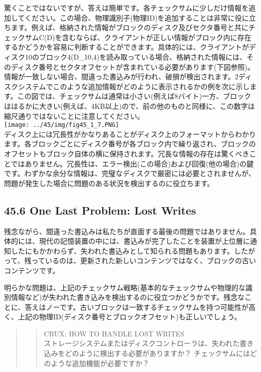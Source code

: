 驚くことではないですが、答えは簡単です。各チェックサムに少しだけ情報を追加してください。この場合、物理識別子(物理ID)を追加することは非常に役に立ちます。例えば、格納された情報がブロックのディスク及びセクタ番号と共にチェックサムC(D)を含むならば、クライアントが正しい情報がブロック内に存在するかどうかを容易に判断することができます。具体的には、クライアントがディスク10のブロック4(D\_10,4)を読み取っている場合、格納された情報には、そのディスク番号とセクタオフセットが含まれている必要があります(下図参照)。情報が一致しない場合、間違った書込みが行われ、破損が検出されます。2ディスクシステムでこのような追加情報がどのように表示されるかの例を次に示します。この図では、チェックサムは通常は小さい(例えば8バイト)一方、ブロックははるかに大きい(例えば、4KB以上)ので、前の他のものと同様に、この数字は縮尺通りではないことに注意してください。\\
\texttt{[image: ../45/img/fig45\_1\_7.PNG]}\\
ディスク上には冗長性がかなりあることがディスク上のフォーマットからわかります。各ブロックごとにディスク番号が各ブロック内で繰り返され、ブロックのオフセットもブロック自体の横に保持されます。冗長な情報の存在は驚くべきことではありません。冗長性は、エラー検出(この場合)および回復(他の場合)の鍵です。わずかな余分な情報は、完璧なディスクで厳密には必要とされませんが、問題が発生した場合に問題のある状況を検出するのに役立ちます。

\hypertarget{one-last-problem-lost-writes}{%
\subsection*{45.6 One Last Problem: Lost
Writes}\label{one-last-problem-lost-writes}}

残念ながら、間違った書込みは私たちが直面する最後の問題ではありません。具体的には、現代の記憶装置の中には、書込みが完了したことを装置が上位層に通知したにもかかわらず、失われた書込みとして知られる問題もあります。したがって、残っているのは、更新された新しいコンテンツではなく、ブロックの古いコンテンツです。

明らかな問題は、上記のチェックサム戦略(基本的なチェックサムや物理的な識別情報など)が失われた書き込みを検出するのに役立つかどうかです。残念なことに、答えはノーです。古いブロックは一致するチェックサムを持つ可能性が高く、上記の物理ID(ディスク番号とブロックオフセット)も正しいでしょう。

\begin{quote}
\begin{quote}
CRUX: HOW TO HANDLE LOST WRITES\\
ストレージシステムまたはディスクコントローラは、失われた書き込みをどのように検出する必要がありますか？
チェックサムにはどのような追加機能が必要ですか？
\end{quote}
\end{quote}


